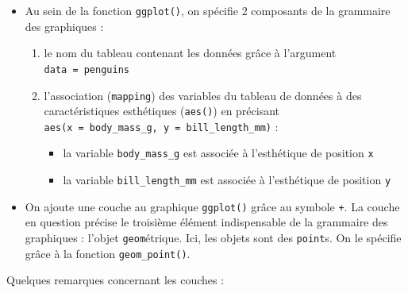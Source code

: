 \documentclass[
  a4paper,
  DIV=11,
  numbers=noendperiod,
  oneside]{scrreprt}
\providecommand{\tightlist}{%
  \setlength{\itemsep}{0pt}\setlength{\parskip}{0pt}}\usepackage{longtable,booktabs,array}
\begin{document}
\begin{tcolorbox}[enhanced jigsaw, coltitle=black, toprule=.15mm, opacityback=0, breakable, colback=white, opacitybacktitle=0.6, colframe=quarto-callout-tip-color-frame, leftrule=.75mm, rightrule=.15mm, titlerule=0mm, bottomtitle=1mm, toptitle=1mm, arc=.35mm, title=\textcolor{quarto-callout-tip-color}{\faLightbulb}\hspace{0.5em}{En résumé}, colbacktitle=quarto-callout-tip-color!10!white, bottomrule=.15mm, left=2mm]

\begin{itemize}
\tightlist
\item
  Au sein de la fonction \texttt{ggplot()}, on spécifie 2 composants de
  la grammaire des graphiques :

  \begin{enumerate}
  \def\labelenumi{\arabic{enumi}.}
  \tightlist
  \item
    le nom du tableau contenant les données grâce à l'argument
    \texttt{data\ =\ penguins}
  \item
    l'association (\texttt{mapping}) des variables du tableau de données
    à des caractéristiques esthétiques (\texttt{aes()}) en précisant
    \texttt{aes(x\ =\ body\_mass\_g,\ y\ =\ bill\_length\_mm)} :

    \begin{itemize}
    \tightlist
    \item
      la variable \texttt{body\_mass\_g} est associée à l'esthétique de
      position \texttt{x}
    \item
      la variable \texttt{bill\_length\_mm} est associée à l'esthétique
      de position \texttt{y}
    \end{itemize}
  \end{enumerate}
\item
  On ajoute une couche au graphique \texttt{ggplot()} grâce au symbole
  \texttt{+}. La couche en question précise le troisième élément
  indispensable de la grammaire des graphiques : l'objet
  \texttt{geom}étrique. Ici, les objets sont des \texttt{point}s. On le
  spécifie grâce à la fonction \texttt{geom\_point()}.
\end{itemize}

\end{tcolorbox}

Quelques remarques concernant les couches :
\end{document}
